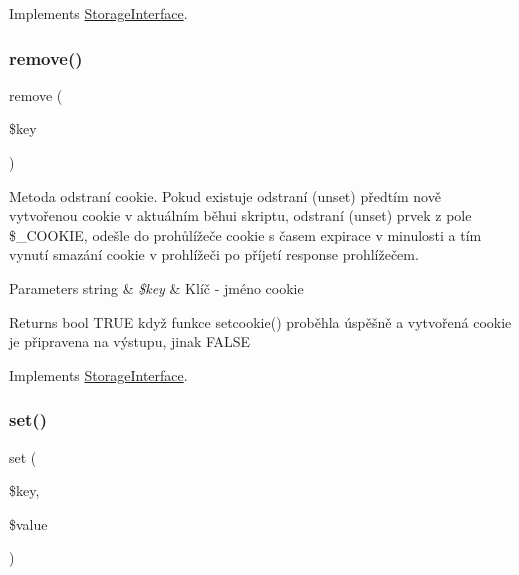 Implements \mbox{\hyperlink{interface_pes_1_1_storage_1_1_storage_interface}{Storage\+Interface}}.

\mbox{\label{class_pes_1_1_storage_1_1_crypted_cookie_storage_a95483af4e2c07dc9893fe058b026bd5d}} 
\subsubsection{\texorpdfstring{remove()}{remove()}}
{\footnotesize\ttfamily remove (\begin{DoxyParamCaption}\item[{}]{\$key }\end{DoxyParamCaption})}

Metoda odstraní cookie. Pokud existuje odstraní (unset) předtím nově vytvořenou cookie v aktuálním běhui skriptu, odstraní (unset) prvek z pole \$\+\_\+\+C\+O\+O\+K\+IE, odešle do prohůlížeče cookie s časem expirace v minulosti a tím vynutí smazání cookie v prohlížeči po příjetí response prohlížečem. 
\begin{DoxyParams}[1]{Parameters}
string & {\em \$key} & Klíč -\/ jméno cookie \\
\hline
\end{DoxyParams}
\begin{DoxyReturn}{Returns}
bool T\+R\+UE když funkce setcookie() proběhla úspěšně a vytvořená cookie je připravena na výstupu, jinak F\+A\+L\+SE 
\end{DoxyReturn}


Implements \mbox{\hyperlink{interface_pes_1_1_storage_1_1_storage_interface}{Storage\+Interface}}.

\mbox{\label{class_pes_1_1_storage_1_1_crypted_cookie_storage_aab787bd83f84f4215dceb35f7c305eee}} 
\subsubsection{\texorpdfstring{set()}{set()}}
{\footnotesize\ttfamily set (\begin{DoxyParamCaption}\item[{}]{\$key,  }\item[{}]{\$value }\end{DoxyParamCaption})}

